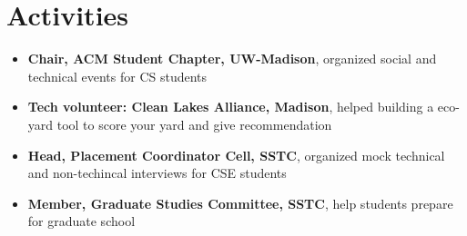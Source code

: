 \documentclass{resume}
\begin{document}

\section{Activities}
\begin{itemize}
  \item \textbf{Chair, ACM Student Chapter, UW-Madison}, organized social and technical events for CS students
  \item \textbf{Tech volunteer: Clean Lakes Alliance, Madison}, helped building a eco-yard tool to score your yard and give recommendation
  \item \textbf{Head, Placement Coordinator Cell, SSTC}, organized mock technical and non-techincal interviews for CSE students
  \item \textbf{Member, Graduate Studies Committee, SSTC}, help students prepare for graduate school
\end{itemize}

%
%
\end{document}
